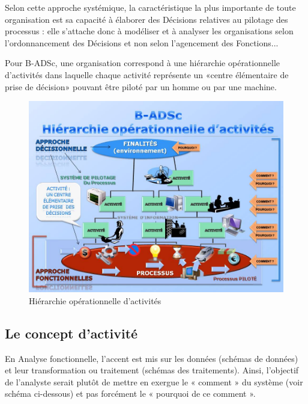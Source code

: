 Selon cette approche systémique, la caractéristique la plus importante de toute organisation est sa capacité à élaborer des Décisions relatives au pilotage des processus : elle s'attache donc à modéliser et à analyser les organisations selon l'ordonnancement des Décisions et non selon l'agencement des Fonctions...

Pour B-ADSc, une organisation correspond à une hiérarchie opérationnelle d’activités dans laquelle chaque activité représente un «centre élémentaire de prise de décision» pouvant être piloté par un homme ou par une machine.\cite{badsc} 

\begin{figure}[H]
\begin{center}
\includegraphics[width=1\linewidth]{images/badsc}
\end{center}
\caption{Hiérarchie opérationnelle d'activités}
\label{fig:8}
\end{figure}


\subsection{ Le concept d’activité}

En Analyse fonctionnelle, l’accent est mis sur les données (schémas de données) et leur transformation ou traitement (schémas des traitements). Ainsi, l’objectif de l’analyste serait plutôt de mettre en exergue le « comment » du système (voir schéma ci-dessous) et pas forcément le « pourquoi de ce comment ».

